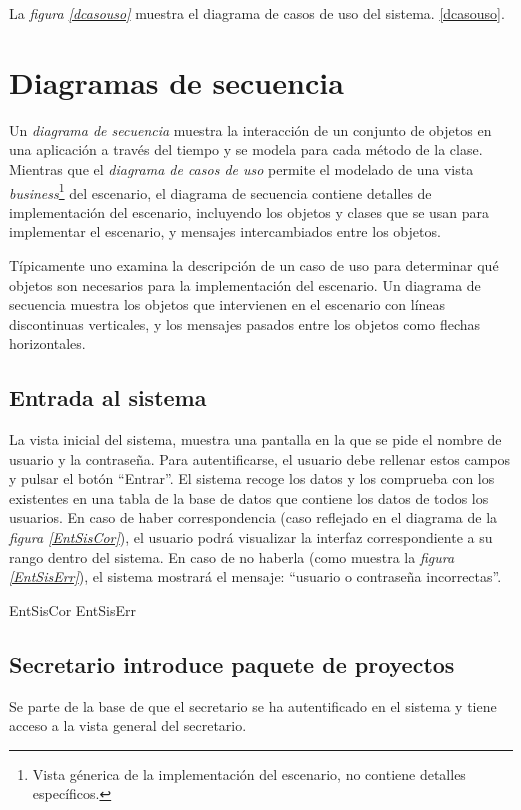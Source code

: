 \documentclass[11pt,a4paper,spanish,twoside]{book}
\begin{document}
La \emph{figura \ref{dcasouso}} muestra el diagrama de casos de uso del
sistema.
\ref{dcasouso}.


\chapter{Diagramas de secuencia}
Un \emph{diagrama de secuencia} muestra la interacción de un conjunto de
objetos en una aplicación a través del tiempo y se modela para cada método de
la clase. Mientras que el \emph{diagrama de casos de uso} permite el modelado
de una vista \emph{business}\footnote{Vista génerica de la implementación del
escenario, no contiene detalles específicos.} del escenario, el diagrama de 
secuencia contiene detalles de implementación del escenario, incluyendo los 
objetos y clases que se usan para implementar el escenario, y mensajes 
intercambiados entre los objetos.

Típicamente uno examina la descripción de un caso de uso para determinar qué
objetos son necesarios para la implementación del escenario. Un diagrama de 
secuencia muestra los objetos que intervienen en el escenario con líneas 
discontinuas verticales, y los mensajes pasados entre los objetos como
flechas horizontales.

\section{Entrada al sistema}
La vista inicial del sistema, muestra una pantalla en la que se pide el nombre
de usuario y la contraseña. Para autentificarse, el usuario debe rellenar
estos campos y pulsar el botón ``Entrar''. El sistema recoge los datos y los
comprueba con los existentes en una tabla de la base de datos que contiene los
datos de todos los usuarios. En caso de haber correspondencia (caso reflejado
en el diagrama de la \emph{figura \ref{EntSisCor}}), el usuario podrá
visualizar la interfaz correspondiente a su rango dentro del sistema. En caso
de no haberla (como muestra la \emph{figura \ref{EntSisErr}}), el sistema 
mostrará el mensaje: ``usuario o contraseña incorrectas''.

{EntSisCor}
{EntSisErr}

\section{Secretario introduce paquete de proyectos}
Se parte de la base de que el secretario se ha autentificado en el sistema y
tiene acceso a la vista general del secretario.
\end{document}
